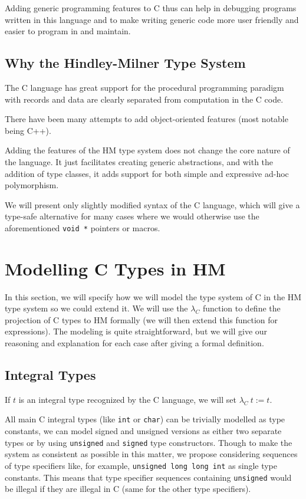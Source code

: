 Adding generic programming features to C thus can help in debugging programs written in this language and to make writing generic code more user friendly and easier to program in and maintain.

\subsection{Why the Hindley-Milner Type System}

The C language has great support for the procedural programming paradigm with records and data are clearly separated from computation in the C code.

There have been many attempts to add object-oriented features (most notable being C++).

Adding the features of the HM type system does not change the core nature of the language. It just facilitates creating generic abstractions, and with the addition of type classes, it adds support for both simple and expressive ad-hoc polymorphism.

We will present only slightly modified syntax of the C language, which will give a type-safe alternative for many cases where we would otherwise use the aforementioned \lstinline{void *} pointers or macros.

\section{Modelling C Types in HM}

In this section, we will specify how we will model the type system of C in the HM type system so we could extend it. We will use the $\lambda_C$ function to define the projection of C types to HM formally (we will then extend this function for expressions). The modeling is quite straightforward, but we will give our reasoning and explanation for each case after giving a formal definition.

\subsection{Integral Types}

\begin{defn}
    If $t$ is an integral type recognized by the C language, we will set $\lambda_C\ t := t$.
\end{defn}

All main C integral types (like \lstinline{int} or \lstinline{char}) can be trivially modelled as type constants, we can model signed and unsigned versions as either two separate types or by using \lstinline{unsigned} and \lstinline{signed} type constructors. Though to make the system as consistent as possible in this matter, we propose considering sequences of type specifiers like, for example, \lstinline{unsigned long long int} as single type constants. This means that type specifier sequences containing \lstinline{unsigned} would be illegal if they are illegal in C (same for the other type specifiers).


